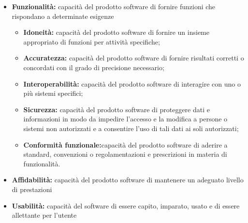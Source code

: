 \documentclass[12pt,a4paper]{article}
\begin{document}
\begin{itemize}
	\item \textbf{Funzionalità: }capacità del prodotto software di fornire funzioni che rispondano a determinate esigenze
	\begin{itemize}
		\item \textbf{Idoneità: }capacità del prodotto software di fornire un insieme appropriato di funzioni per attività specifiche;
		\item \textbf{Accuratezza:} capacità del prodotto software di fornire risultati corretti o concordati con il grado di precisione necessario;
		\item \textbf{Interoperabilità: }capacità del prodotto software di interagire con uno o	più sistemi specifici;
		\item \textbf{Sicurezza:} capacità del prodotto software di proteggere dati e informazioni in modo da impedire l'accesso e la modifica a persone o sistemi non autorizzati e a consentire l'uso di tali dati ai soli autorizzati;
		\item \textbf{Conformità funzionale:}capacità del prodotto software di aderire a standard, convenzioni o regolamentazioni e prescrizioni in materia di funzionalità.
	\end{itemize}
	\item \textbf{Affidabilità:} capacità del prodotto software di mantenere un adeguato livello di prestazioni
	\item \textbf{Usabilità:} capacità del software di essere capito, imparato, usato e di essere allettante per l'utente
	\begin{itemize}

\end{itemize}
\end{itemize}
\end{document}
